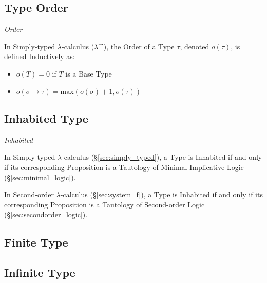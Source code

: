 \subsection{Type Order}\label{sec:type_order}

\emph{Order}

In Simply-typed $\lambda$-calculus ($\lambda^\rightarrow$), the Order
of a Type $\tau$, denoted $o(\tau)$, is defined Inductively as:
\begin{itemize}
\item $o(T) = 0$ if $T$ is a Base Type
\item $o(\sigma \rightarrow \tau) = \text{max}(o(\sigma) + 1,
  o(\tau))$
\end{itemize}



\subsection{Inhabited Type}\label{sec:inhabited_type}

\emph{Inhabited}

In Simply-typed $\lambda$-calculus (\S\ref{sec:simply_typed}), a Type
is Inhabited if and only if its corresponding Proposition is a
Tautology of Minimal Implicative Logic (\S\ref{sec:minimal_logic}).

In Second-order $\lambda$-calculus (\S\ref{sec:system_f}), a
Type is Inhabited if and only if its corresponding Proposition is a
Tautology of Second-order Logic (\S\ref{sec:secondorder_logic}).



\subsection{Finite Type}\label{sec:finite_type}

\subsection{Infinite Type}\label{sec:infinite_type}


